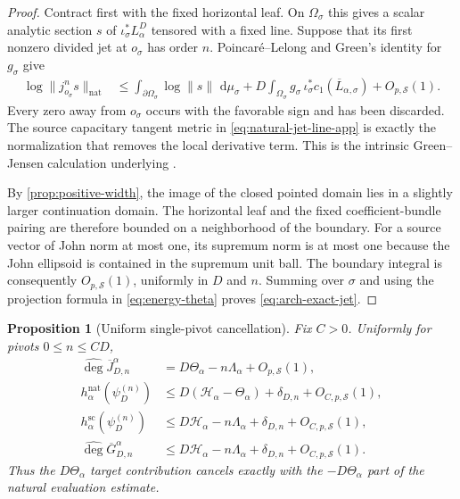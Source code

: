 \documentclass[11pt]{article}
\newtheorem{proposition}[proposition]{Proposition}
\theoremstyle{definition}
\theoremstyle{remark}
\newcommand{\dd}{\,\mathrm d}
\newcommand{\widehatdeg}{\widehat{\deg}}
\newcommand{\Energy}{\mathscr H}
\newcommand{\LambdaAH}{\Lambda}
\begin{document}
\begin{proof}
Contract first with the fixed horizontal leaf.  On $\Omega_\sigma$ this gives
a scalar analytic section $s$ of $\iota_\sigma^*L_\alpha^D$ tensored with a
fixed line.  Suppose that its first nonzero divided jet at $o_\sigma$ has
order $n$.  Poincar\'e--Lelong and Green's identity for $g_\sigma$ give
\begin{align*}
 \log\|j_{o_\sigma}^ns\|_{\mathrm{nat}}
 &\le
 \int_{\partial\Omega_\sigma}\log\|s\|\,\dd\mu_\sigma
 +D\int_{\Omega_\sigma}
   g_\sigma\,\iota_\sigma^*c_1(\overline L_{\alpha,\sigma})
 +O_{p,\mathcal S}(1).
\end{align*}
Every zero away from $o_\sigma$ occurs with the favorable sign and has been
discarded.  The source capacitary tangent metric in
\eqref{eq:natural-jet-line-app} is exactly the normalization that removes the
local derivative term.  This is the intrinsic Green--Jensen calculation
underlying \cite[Lemma~7.4.1]{CDT2024}.

By \cref{prop:positive-width}, the image of the closed pointed domain lies in
a slightly larger continuation domain.  The horizontal leaf and the fixed
coefficient-bundle pairing are therefore bounded on a neighborhood of the
boundary.  For a source vector of John norm at most one, its supremum norm is
at most one because the John ellipsoid is contained in the supremum unit
ball.  The boundary integral is consequently $O_{p,\mathcal S}(1)$,
uniformly in $D$ and $n$.  Summing over $\sigma$ and using the projection
formula in \eqref{eq:energy-theta} proves \eqref{eq:arch-exact-jet}.
\end{proof}

\begin{proposition}[Uniform single-pivot cancellation]
\label{prop:exact-single-jet}
Fix $C>0$.  Uniformly for pivots $0\le n\le CD$,
\begin{align}
 \widehatdeg\overline J_{D,n}^\alpha
 &=D\Theta_\alpha-n\LambdaAH_\alpha+O_{p,\mathcal S}(1),
 \label{eq:app-target-degree}\\
 h_\alpha^{\mathrm{nat}}(\psi_D^{(n)})
 &\le D(\Energy_\alpha-\Theta_\alpha)+\delta_{D,n}
      +O_{C,p,\mathcal S}(1),
 \label{eq:app-natural-height}\\
 h_\alpha^{\mathrm{sc}}(\psi_D^{(n)})
 &\le D\Energy_\alpha-n\LambdaAH_\alpha+\delta_{D,n}
      +O_{C,p,\mathcal S}(1),
 \label{eq:app-scalar-height}\\
 \widehatdeg\overline G_{D,n}^\alpha
 &\le D\Energy_\alpha-n\LambdaAH_\alpha+\delta_{D,n}
      +O_{C,p,\mathcal S}(1).
 \label{eq:app-graded-degree}
\end{align}
Thus the $D\Theta_\alpha$ target contribution cancels exactly with the
$-D\Theta_\alpha$ part of the natural evaluation estimate.
\end{proposition}
\end{document}
